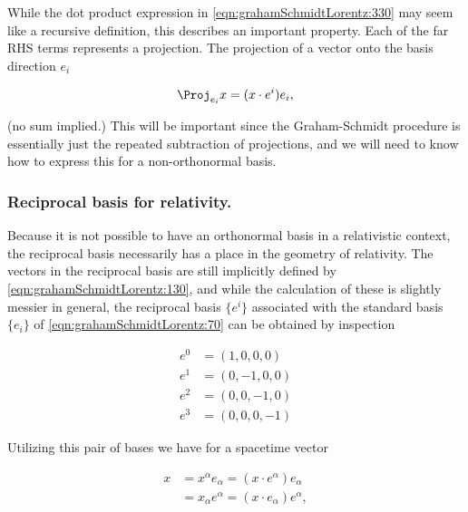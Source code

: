 \documentclass[iop,tighten]{emulateapj}
\begin{document}
While the dot product expression in \ref{eqn:grahamSchmidtLorentz:330} may seem like a recursive definition, this describes an important property.  Each of the far RHS terms represents a projection.  The projection of a vector onto the basis direction $e_i$

\begin{equation}\label{eqn:grahamSchmidtLorentz:560}
\Proj_{e_i} x = (x \cdot e^i) e_i,
\end{equation}

(no sum implied.)  This will be important since the Graham-Schmidt procedure is essentially just the repeated subtraction of projections, and we will need to know how to express this for a non-orthonormal basis.

\subsubsection{Reciprocal basis for relativity.}

Because it is not possible to have an orthonormal basis in a relativistic context, the reciprocal basis necessarily has a place in the geometry of relativity.  The vectors in the reciprocal basis are still implicitly defined by \ref{eqn:grahamSchmidtLorentz:130}, and while the calculation of these is slightly messier in general, the reciprocal basis $\{e^i\}$ associated with the standard basis $\{e_i\}$ of \ref{eqn:grahamSchmidtLorentz:70} can be obtained by inspection

\begin{equation}\label{eqn:grahamSchmidtLorentz:70b}
\begin{aligned}
e^0 &= (1, 0, 0, 0) \\
e^1 &= (0, -1, 0, 0) \\
e^2 &= (0, 0, -1, 0) \\
e^3 &= (0, 0, 0, -1) 
\end{aligned}
\end{equation}

Utilizing this pair of bases we have for a spacetime vector

\begin{equation}\label{eqn:grahamSchmidtLorentz:331}
\begin{aligned}
x &= x^\alpha e_\alpha = (x \cdot e^\alpha) e_\alpha \\
  &= x_\alpha e^\alpha = (x \cdot e_\alpha) e^\alpha,
\end{aligned}
\end{equation}
\end{document}
